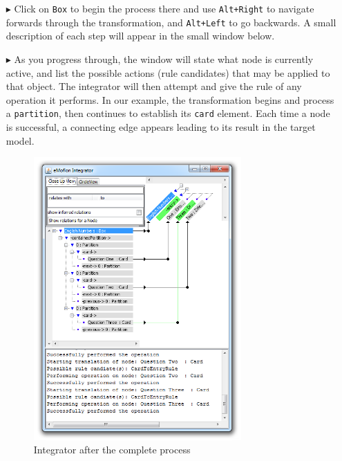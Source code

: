 \begin{itemize}
\item[$\blacktriangleright$]  Click on \texttt{Box} to begin the process there and use \texttt{Alt+Right} to navigate forwards through the
transformation, and \texttt{Alt+Left} to go backwards. A small description of each step will appear in the small window below.

\item[$\blacktriangleright$] As you progress through, the window will state what node is currently active, and list the possible actions (rule candidates) that
may be applied to that object. The integrator will then attempt and give the rule of any operation it performs. In our example, the transformation begins and
process a \texttt{partition}, then continues to establish its \texttt{card} element. Each time a node is successful, a connecting edge appears leading to its
result in the target model. 

\vspace{0.5cm}

\begin{figure}[h!]
\begin{center}
  \includegraphics[width=0.75\textwidth]{eclipse_integratorPerformed}
  \caption{Integrator after the complete process}
  \label{eclipse:integrator_after_protocol}
\end{center}
\end{figure} 


\end{itemize}
